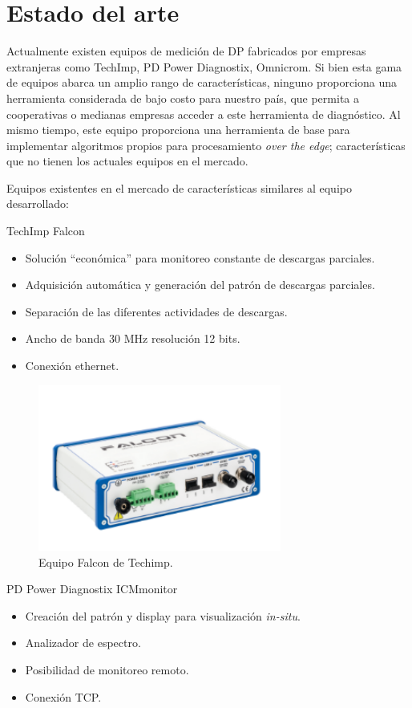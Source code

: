 \section{Estado del arte}
Actualmente existen equipos de medición de DP fabricados por empresas extranjeras como TechImp, PD Power Diagnostix, Omnicrom. Si bien esta gama de equipos abarca un amplio rango de características, ninguno proporciona una herramienta considerada de bajo costo para nuestro país, que permita a cooperativas o medianas empresas acceder a este herramienta de diagnóstico. Al mismo tiempo, este equipo proporciona una herramienta de base para implementar algoritmos propios para procesamiento \textit{over the edge}; características que no tienen los actuales equipos en el mercado. 

Equipos existentes en el mercado de características similares al equipo desarrollado:

TechImp Falcon \citep{falconWeb:1}
\begin{itemize}
\item Solución “económica” para monitoreo constante de descargas parciales.
\item Adquisición automática y generación del patrón de descargas parciales.
\item Separación de las diferentes actividades de descargas.
\item Ancho de banda 30 MHz resolución 12 bits.
\item Conexión ethernet.
\end{itemize}

\begin{figure}[h!]
	\centering
	\includegraphics[width=80mm]{./Figures/arte1.png}
	\caption{Equipo Falcon de Techimp.}
	\label{fig:arte1}
\end{figure}


\vspace{15mm}
PD Power Diagnostix ICMmonitor \citep{pdWeb:1}
\begin{itemize}
\item Creación del patrón y display para visualización \textit{in-situ}.
\item Analizador de espectro.
\item Posibilidad de monitoreo remoto.
\item Conexión TCP.
\end{itemize}

